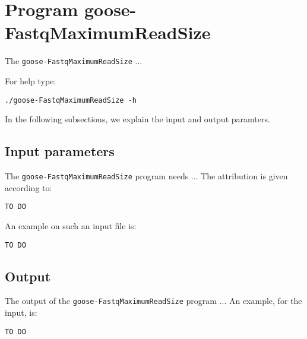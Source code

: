 \section{Program goose-FastqMaximumReadSize}
The \texttt{goose-FastqMaximumReadSize} ...

For help type:
\begin{lstlisting}
./goose-FastqMaximumReadSize -h
\end{lstlisting}
In the following subsections, we explain the input and output paramters.

\subsection*{Input parameters}

The \texttt{goose-FastqMaximumReadSize} program needs ...
The attribution is given according to:
\begin{lstlisting}
TO DO
\end{lstlisting}

An example on such an input file is:
\begin{lstlisting}
TO DO
\end{lstlisting}

\subsection*{Output}
The output of the \texttt{goose-FastqMaximumReadSize} program ...
An example, for the input, is:
\begin{lstlisting}
TO DO
\end{lstlisting}
